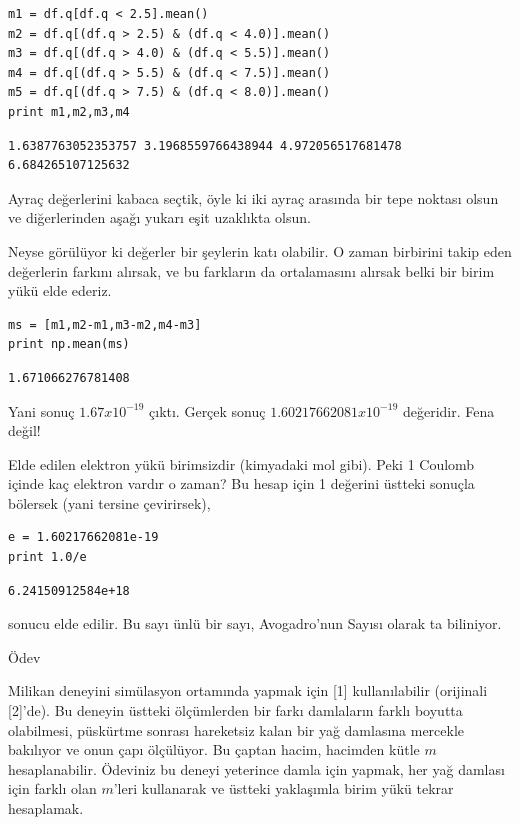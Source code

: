 \documentclass[12pt,fleqn]{article}\usepackage{../../common}
\begin{document}
\begin{verbatim}
m1 = df.q[df.q < 2.5].mean()
m2 = df.q[(df.q > 2.5) & (df.q < 4.0)].mean()
m3 = df.q[(df.q > 4.0) & (df.q < 5.5)].mean()
m4 = df.q[(df.q > 5.5) & (df.q < 7.5)].mean()
m5 = df.q[(df.q > 7.5) & (df.q < 8.0)].mean()
print m1,m2,m3,m4
\end{verbatim}

\begin{verbatim}
1.6387763052353757 3.1968559766438944 4.972056517681478 6.684265107125632
\end{verbatim}

Ayraç değerlerini kabaca seçtik, öyle ki iki ayraç arasında bir tepe
noktası olsun ve diğerlerinden aşağı yukarı eşit uzaklıkta olsun.

Neyse görülüyor ki değerler bir şeylerin katı olabilir. O zaman birbirini
takip eden değerlerin farkını alırsak, ve bu farkların da ortalamasını
alırsak belki bir birim yükü elde ederiz.

\begin{verbatim}
ms = [m1,m2-m1,m3-m2,m4-m3]
print np.mean(ms)
\end{verbatim}

\begin{verbatim}
1.671066276781408
\end{verbatim}

Yani sonuç $1.67 x 10^{-19}$ çıktı. Gerçek sonuç $1.60217662081 x 10^{-19}$
değeridir. Fena değil!

Elde edilen elektron yükü birimsizdir (kimyadaki mol gibi). Peki 1 Coulomb
içinde kaç elektron vardır o zaman? Bu hesap için 1 değerini üstteki
sonuçla bölersek (yani tersine çevirirsek),

\begin{verbatim}
e = 1.60217662081e-19
print 1.0/e
\end{verbatim}

\begin{verbatim}
6.24150912584e+18
\end{verbatim}

sonucu elde edilir. Bu sayı ünlü bir sayı, Avogadro'nun Sayısı olarak ta
biliniyor.

Ödev

Milikan deneyini simülasyon ortamında yapmak için [1] kullanılabilir
(orijinali [2]'de). Bu deneyin üstteki ölçümlerden bir farkı damlaların
farklı boyutta olabilmesi, püskürtme sonrası hareketsiz kalan bir yağ
damlasına mercekle bakılıyor ve onun çapı ölçülüyor. Bu çaptan hacim,
hacimden kütle $m$ hesaplanabilir. Ödeviniz bu deneyi yeterince damla için
yapmak, her yağ damlası için farklı olan $m$'leri kullanarak ve üstteki
yaklaşımla birim yükü tekrar hesaplamak.
\end{document}
